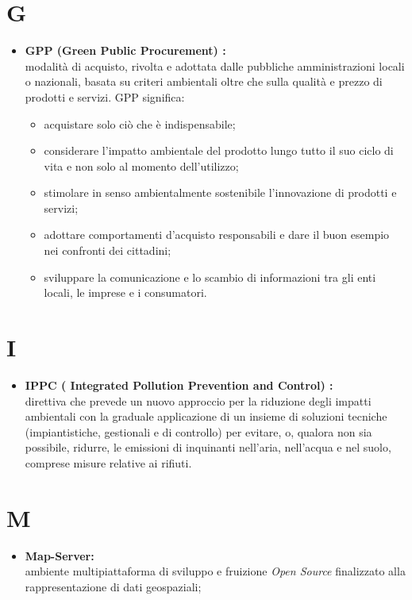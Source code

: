 \documentclass[11pt]{book}              %
\begin{document}
\section*{G}
\begin{itemize}

	\item \textbf{{\color{OliveGreen}GPP} (Green Public Procurement) :} \\
	modalità di acquisto, rivolta e adottata dalle pubbliche amministrazioni locali o nazionali, basata su criteri ambientali oltre che sulla qualità e prezzo di prodotti e servizi. 
	GPP significa:
	\begin{itemize}
		\item acquistare solo ciò che è indispensabile;
	 	\item considerare l’impatto ambientale del prodotto lungo tutto il suo ciclo di vita e non solo al momento dell’utilizzo;
    		\item stimolare in senso ambientalmente sostenibile l’innovazione di prodotti e servizi;
    		\item adottare comportamenti d’acquisto responsabili e dare il buon esempio nei confronti dei cittadini;
    		\item sviluppare la comunicazione e lo scambio di informazioni tra gli enti locali, le imprese e i consumatori.
	\end{itemize}

\end{itemize}

\section*{I}
\begin{itemize}

	\item \textbf{{\color{OliveGreen}IPPC} ( Integrated Pollution Prevention and Control) :} \\
	 direttiva che prevede un nuovo approccio per la riduzione degli impatti ambientali con la graduale applicazione di un insieme di soluzioni tecniche (impiantistiche, gestionali e di controllo) per evitare, o, qualora non sia possibile, ridurre, le emissioni di inquinanti nell'aria, nell'acqua e nel suolo, comprese misure relative ai rifiuti.

\end{itemize}

\section*{M}
\begin{itemize}
	\item \textbf{{\color{Plum} Map-Server}:} \\
	ambiente multipiattaforma di sviluppo e fruizione \textit{Open Source} finalizzato alla rappresentazione di dati geospaziali;
\end{itemize}
\end{document}

